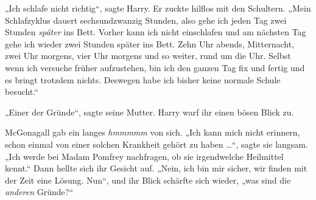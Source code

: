 „Ich schlafe nicht richtig“, sagte Harry. Er zuckte hilflos mit den Schultern.
„Mein Schlafzyklus dauert sechsundzwanzig Stunden, also gehe ich jeden Tag zwei Stunden \emph{später} ins Bett. Vorher kann ich nicht einschlafen und am nächsten Tag gehe ich wieder zwei Stunden später ins Bett. Zehn Uhr abends, Mitternacht, zwei Uhr morgens, vier Uhr morgens und so weiter, rund um die Uhr. Selbst wenn ich versuche früher aufzustehen, bin ich den ganzen Tag fix und fertig und es bringt trotzdem nichts. Deswegen habe ich bisher keine normale Schule besucht.“

„Einer der Gründe“, sagte seine Mutter. Harry warf ihr einen bösen Blick zu.

McGonagall gab ein langes \emph{hmmmmm} von sich.
„Ich kann mich nicht erinnern, schon einmal von einer solchen Krankheit gehört zu haben …“, sagte sie langsam.
„Ich werde bei Madam Pomfrey nachfragen, ob sie irgendwelche Heilmittel kennt.“ Dann hellte sich ihr Gesicht auf.
„Nein, ich bin mir sicher, wir finden mit der Zeit eine Lösung. Nun“, und ihr Blick schärfte sich wieder, „was sind die \emph{anderen} Gründe?“

